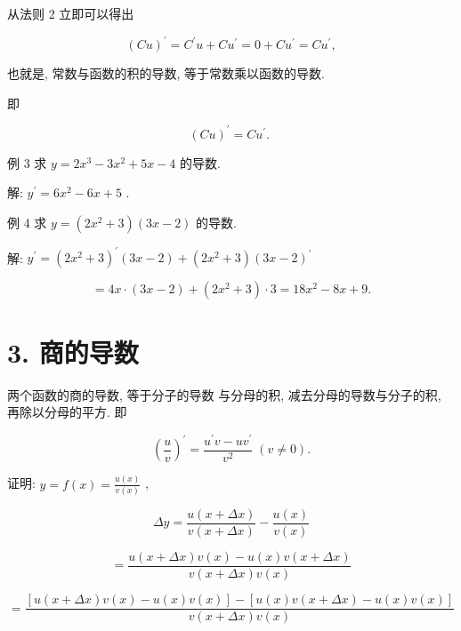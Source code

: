 \documentclass[lang=cn,newtx,10pt,scheme=chinese]{elegantbook}
\begin{document}
从法则 2 立即可以得出

\[
{\left( Cu\right) }^{\prime } = {C}^{\prime }u + C{u}^{\prime } = 0 + C{u}^{\prime } = C{u}^{\prime },
\]

也就是, 常数与函数的积的导数, 等于常数乘以函数的导数.

即

\[
{\left( Cu\right) }^{\prime } = C{u}^{\prime }\text{. }
\]

例 3 求 \(y = 2{x}^{3} - 3{x}^{2} + {5x} - 4\) 的导数.

解: \({y}^{\prime } = 6{x}^{2} - {6x} + 5\) .

例 4 求 \(y = \left( {2{x}^{2} + 3}\right) \left( {{3x} - 2}\right)\) 的导数.

解: \({y}^{\prime } = {\left( 2{x}^{2} + 3\right) }^{\prime }\left( {{3x} - 2}\right) + \left( {2{x}^{2} + 3}\right) {\left( 3x - 2\right) }^{\prime }\)

\[
= {4x} \cdot \left( {{3x} - 2}\right) + \left( {2{x}^{2} + 3}\right) \cdot 3 = {18}{x}^{2} - {8x} + 9\text{.}
\]

\section*{3. 商的导数}

\begin{proposition}[法则3(除法法则)]

两个函数的商的导数, 等于分子的导数 与分母的积, 减去分母的导数与分子的积, 再除以分母的平方. 即

\[
{\left( \frac{u}{v}\right) }^{\prime } = \frac{{u}^{\prime }v - u{v}^{\prime }}{{v}^{2}}\;\left( {v \neq 0}\right) .
\]

\end{proposition}

证明: \(y = f\left( x\right) = \frac{u\left( x\right) }{v\left( x\right) }\) ,

\[
{\Delta y} = \frac{u\left( {x + {\Delta x}}\right) }{v\left( {x + {\Delta x}}\right) } - \frac{u\left( x\right) }{v\left( x\right) }
\]

\[
= \frac{u\left( {x + {\Delta x}}\right) v\left( x\right) - u\left( x\right) v\left( {x + {\Delta x}}\right) }{v\left( {x + {\Delta x}}\right) v\left( x\right) }
\]

\[
= \frac{\left\lbrack {u\left( {x + {\Delta x}}\right) v\left( x\right) - u\left( x\right) v\left( x\right) }\right\rbrack - \left\lbrack {u\left( x\right) v\left( {x + {\Delta x}}\right) - u\left( x\right) v\left( x\right) }\right\rbrack }{v\left( {x + {\Delta x}}\right) v\left( x\right) }
\]
\end{document}
